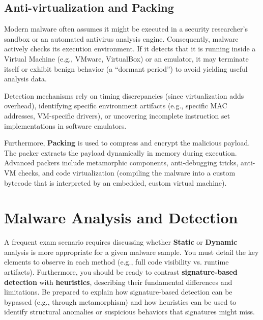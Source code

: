 \subsection{Anti-virtualization and Packing}
Modern malware often assumes it might be executed in a security researcher's sandbox or an automated antivirus analysis engine. Consequently, malware actively checks its execution environment. If it detects that it is running inside a Virtual Machine (e.g., VMware, VirtualBox) or an emulator, it may terminate itself or exhibit benign behavior (a ``dormant period'') to avoid yielding useful analysis data.

Detection mechanisms rely on timing discrepancies (since virtualization adds overhead), identifying specific environment artifacts (e.g., specific MAC addresses, VM-specific drivers), or uncovering incomplete instruction set implementations in software emulators.

Furthermore, \textbf{Packing} is used to compress and encrypt the malicious payload. The packer extracts the payload dynamically in memory during execution. Advanced packers include metamorphic components, anti-debugging tricks, anti-VM checks, and code virtualization (compiling the malware into a custom bytecode that is interpreted by an embedded, custom virtual machine).

\section{Malware Analysis and Detection}

\begin{tcolorbox}[colback=blue!5!white,colframe=blue!75!black,title=Exam Insight]
A frequent exam scenario requires discussing whether \textbf{Static} or \textbf{Dynamic} analysis is more appropriate for a given malware sample. You must detail the key elements to observe in each method (e.g., full code visibility vs. runtime artifacts). Furthermore, you should be ready to contrast \textbf{signature-based detection} with \textbf{heuristics}, describing their fundamental differences and limitations. Be prepared to explain how signature-based detection can be bypassed (e.g., through metamorphism) and how heuristics can be used to identify structural anomalies or suspicious behaviors that signatures might miss.
\end{tcolorbox}

